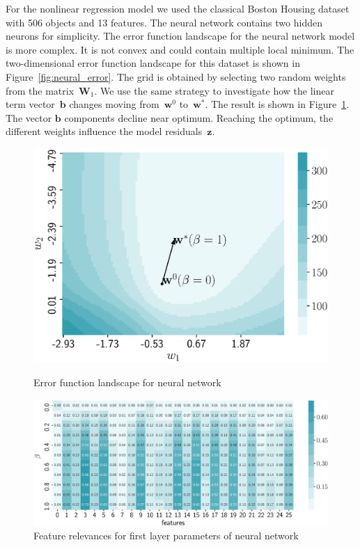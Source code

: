 \documentclass[a4paper,12pt]{article}
\theoremstyle{plain} %
\theoremstyle{definition} %
\theoremstyle{remark} %
\newcommand{\bb}{\mathbf{b}}
\newcommand{\bw}{\mathbf{w}}
\newcommand{\bz}{\mathbf{z}}
\newcommand{\bW}{\mathbf{W}}
\begin{document}
For the nonlinear regression model we used the classical Boston Housing dataset with 506 objects and 13 features.
The neural network contains two hidden neurons for simplicity.
The error function landscape for the neural network model is more complex. 
It is not convex and could contain multiple local minimum.
The two-dimensional error function landscape for this dataset is shown in Figure~\ref{fig:neural_error}. 
The grid is obtained by selecting two random weights from the matrix~$\bW_1$.
We use the same strategy to investigate how the linear term vector~$\bb$ changes moving from~$\bw^0$ to~$\bw^*$. 
The result is shown in Figure~\ref{fig:neural_b_wrt_beta}.
The vector $\bb$ components decline near optimum. 
Reaching the optimum, the different weights influence the model residuals~$\bz$.
\begin{figure}
	\centering
	\begin{minipage}{.5\textwidth}
		\centering
		\includegraphics[width=\linewidth]{figs/neural_error.eps}
		\caption{Error function landscape for neural network}
		\label{fig:neural_error}
	\end{minipage}%
	\begin{minipage}{.5\textwidth}
		\centering
		\includegraphics[width=\linewidth]{figs/neural_b_wrt_beta.eps}
		\caption{Feature relevances for first layer parameters of neural network}
		\label{fig:neural_b_wrt_beta}
	\end{minipage}
\end{figure}
\end{document}
